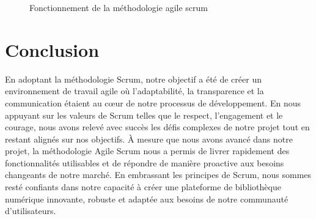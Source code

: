 	\begin{figure}[H]%
    \center%
    \setlength{\fboxsep}{5pt}%
    \setlength{\fboxrule}{0.5pt}%
    \caption{Fonctionnement de la méthodologie agile scrum}%
\end{figure} \par

\section*{Conclusion}

En adoptant la méthodologie Scrum, notre objectif a été de créer un environnement de travail agile où l'adaptabilité, la transparence et la communication étaient au cœur de notre processus de développement. En nous appuyant sur les valeurs de Scrum telles que le respect, l'engagement et le courage, nous avons relevé avec succès les défis complexes de notre projet tout en restant alignés sur nos objectifs.
À mesure que nous avons avancé dans notre projet, la méthodologie Agile Scrum nous a permis de livrer rapidement des fonctionnalités utilisables et de répondre de manière proactive aux besoins changeants de notre marché. En embrassant les principes de Scrum, nous sommes resté confiants dans notre capacité à créer une plateforme de bibliothèque numérique innovante, robuste et adaptée aux besoins de notre communauté d'utilisateurs.
\par
